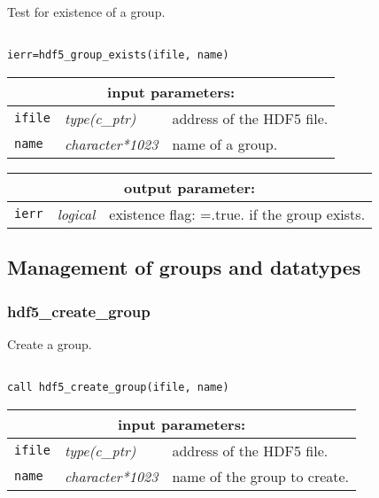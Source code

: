 Test for existence of a group.

\begin{verbatim}

ierr=hdf5_group_exists(ifile, name)
\end{verbatim}

\noindent
\begin{tabular}{|p{1.5cm}|p{3cm}|p{10cm}|}
\hline
\multicolumn{3}{|c|}{\bf input parameters:} \\
\hline
{\tt ifile} & {\it type(c\_ptr)} & address of the HDF5 file. \\
\hline
{\tt name} & {\it character*1023} & name of a group. \\
\hline
\end{tabular}

\vskip 0.8cm

\noindent
\begin{tabular}{|p{1.5cm}|p{3cm}|p{10cm}|}
\hline
\multicolumn{3}{|c|}{\bf output parameter:} \\
\hline
{\tt ierr} & {\it logical} & existence flag: =.true. if the group exists. \\
\hline
\end{tabular}

\vskip 0.8cm

\subsection{Management of groups and datatypes}

\subsubsection{hdf5\_create\_group}

Create a group.

\begin{verbatim}

call hdf5_create_group(ifile, name)
\end{verbatim}

\noindent
\begin{tabular}{|p{1.5cm}|p{3cm}|p{10cm}|}
\hline
\multicolumn{3}{|c|}{\bf input parameters:} \\
\hline
{\tt ifile} & {\it type(c\_ptr)} & address of the HDF5 file. \\
\hline
{\tt name} & {\it character*1023} & name of the group to create. \\
\hline
\end{tabular}

